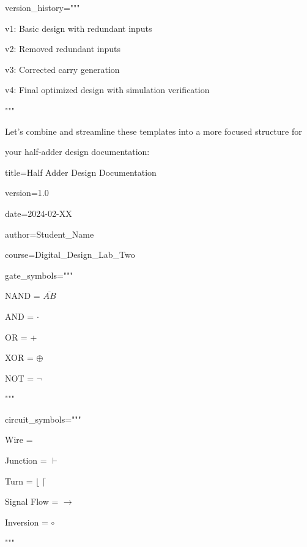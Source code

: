 \documentclass[11pt]{article}
\begin{document}

\noindent version\_history="""

\noindent v1: Basic design with redundant inputs

\noindent v2: Removed redundant inputs

\noindent v3: Corrected carry generation

\noindent v4: Final optimized design with simulation verification

\noindent """

\noindent Let's combine and streamline these templates into a more focused structure for

\noindent your half-adder design documentation:

\vspace{0.5em}


\noindent title=Half Adder Design Documentation

\noindent version=1.0

\noindent date=2024-02-XX

\noindent author=Student\_Name

\noindent course=Digital\_Design\_Lab\_Two

\vspace{0.5em}


\noindent gate\_symbols="""

\noindent NAND = $\overline{AB}$

\noindent AND = $\cdot$

\noindent OR = +

\noindent XOR = $\oplus$

\noindent NOT = $\lnot$

\noindent """

\vspace{0.5em}

\noindent circuit\_symbols="""

\noindent Wire = \textemdash

\noindent Junction = $\vdash$

\noindent Turn =  $\lfloor$ $\lceil$

\noindent Signal Flow = $\rightarrow$

\noindent Inversion = $\circ$

\noindent """

\vspace{0.5em}
\end{document}
